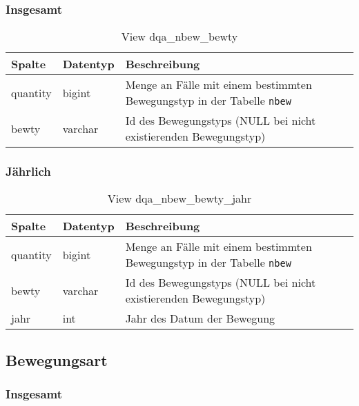 \subsubsection{Insgesamt} \label{subsubsec:bewtypI}

\begin{table}[ht]
	\centering   
	\caption{View dqa\_nbew\_bewty}
	\label{tab:bewBtyI}
	\begin{tabular}{||l|l|p{10cm}||}   		
		\hline
		Spalte & Datentyp & Beschreibung \\ [0.5ex]
		\hline\hline
		quantity & bigint & Menge an Fälle mit einem bestimmten Bewegungstyp in der Tabelle \texttt{nbew} \\
		\hline
		bewty & varchar & Id des Bewegungstyps (NULL bei nicht existierenden Bewegungstyp)\\
		\hline
		
	\end{tabular}
\end{table}

\newpage

\subsubsection{Jährlich} \label{subsubsec:bewtypJ}

\begin{table}[ht]
	\centering   
	\caption{View dqa\_nbew\_bewty\_jahr}
	\label{tab:bewBtyJ}
	\begin{tabular}{||l|l|p{10cm}||}   		
		\hline
		Spalte & Datentyp & Beschreibung \\ [0.5ex]
		\hline\hline
		quantity & bigint & Menge an Fälle mit einem bestimmten Bewegungstyp in der Tabelle \texttt{nbew}\\
		\hline
		bewty & varchar & Id des Bewegungstyps (NULL bei nicht existierenden Bewegungstyp)\\
		\hline
		jahr & int &  Jahr des Datum der Bewegung \\
		\hline		
	\end{tabular}
\end{table}

\subsection{Bewegungsart} \label{subsec:bewart}

\subsubsection{Insgesamt} \label{subsubsec:bewartI}

